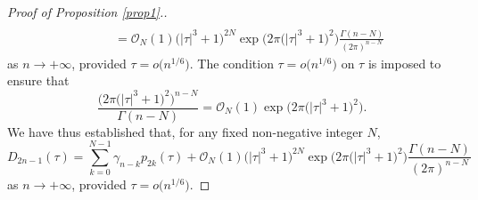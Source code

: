 \begin{proof}[Proof of Proposition \ref{prop1}.]
\begin{align*}
\\ &\qquad = \mathcal{O}_N (1)\bigl(\left| \tau \right|^3 + 1\bigr)^{2N} \exp \big( 2\pi \bigl(\left| \tau \right|^3 + 1\bigr)^2 \big)\frac{\Gamma(n - N)}{(2\pi )^{n - N} }
\end{align*}
as $n\to+\infty$, provided $\tau = o\big(n^{1/6}\big)$. The condition $\tau = o\big(n^{1/6}\big)$ on $\tau$ is imposed to ensure that
\[
\frac{\big(2\pi \bigl(\left| \tau \right|^3 + 1\bigr)^2 \big)^{n - N} }{\Gamma(n - N)} = \mathcal{O}_N (1) \exp \big( 2\pi \bigl(\left| \tau \right|^3 + 1\bigr)^2 \big).
\]
We have thus established that, for any fixed non-negative integer $N$,
\begin{equation}\label{eq5}
D_{2n - 1} (\tau ) = \sum_{k = 0}^{N - 1}\gamma _{n - k} p_{2k} (\tau ) + \mathcal{O}_N (1)\bigl(\left| \tau \right|^3 + 1\bigr)^{2N} \exp \big( 2\pi \bigl(\left| \tau \right|^3 + 1\bigr)^2 \big)\frac{\Gamma(n - N)}{(2\pi )^{n - N} }
\end{equation}
as $n\to+\infty$, provided $\tau = o\big(n^{1/6}\big)$.


\end{proof}
